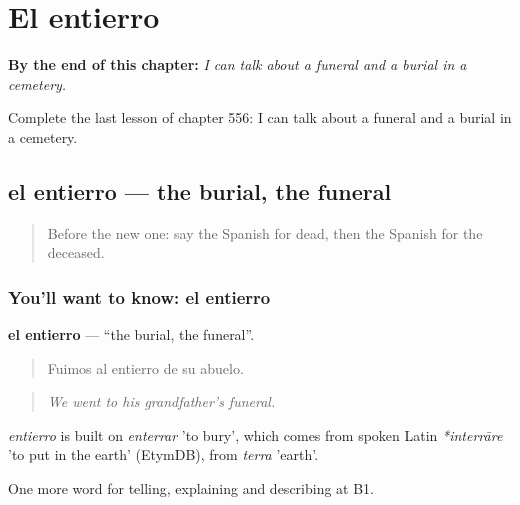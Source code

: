 
\chapter{El entierro}
\label{ch:es-el-entierro}

\begin{chapteropening}
\textbf{By the end of this chapter:} \emph{I can talk about a funeral and a burial in a cemetery.}

Complete the last lesson of chapter 556: I can talk about a funeral and a burial in a cemetery.
\end{chapteropening}

\section[el entierro]{el entierro — the burial, the funeral}

\label{lesson:ES-C556-entierro}



\begin{quote}
Before the new one: say the Spanish for dead, then the Spanish for the deceased.
\end{quote}

\subsection*{You'll want to know: el entierro}
\textbf{el entierro} — \textquotedblleft{}the burial, the funeral\textquotedblright{}.

\begin{quote}
Fuimos al entierro de su abuelo.
\end{quote}

\begin{quote}
\emph{We went to his grandfather's funeral.}
\end{quote}

\begin{cousinweb}
\emph{entierro} is built on \emph{enterrar} 'to bury', which comes from spoken Latin \emph{*interrāre} 'to put in the earth' (EtymDB), from \emph{terra} 'earth'.
\end{cousinweb}

\begin{grammarlens}[title={What you've built}]
One more word for telling, explaining and describing at B1.
\end{grammarlens}

